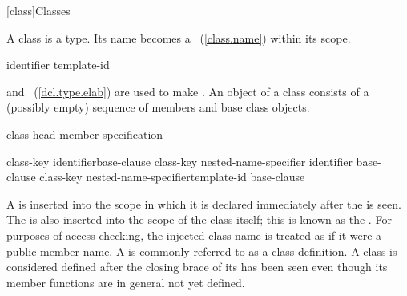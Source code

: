 [class]{Classes}%



\pnum
{}%
%
%
%
A class is a type.
%
Its name becomes a ~(\ref{class.name}) within its
scope.

\begin{bnf}
\br
    identifier\br
    template-id
\end{bnf}

 and
~(\ref{dcl.type.elab}) are used to
make . An object of a class consists of a
(possibly empty) sequence of members and base class objects.

\begin{bnf}
\br
    class-head \terminal{\{} member-specification\opt \terminal{\}}
\end{bnf}

\begin{bnf}
\br
    class-key identifier\opt base-clause\opt\br
    class-key nested-name-specifier identifier base-clause\opt\br
    class-key nested-name-specifier\opt template-id base-clause\opt
\end{bnf}

\begin{bnf}
\br
    \br
    \br
\end{bnf}

\pnum
A  is inserted into the scope in which it is
declared immediately after the  is seen. The
 is also inserted into the scope of the class
itself; this is known as the .
%
For purposes of access checking, the injected-class-name is treated as
if it were a public member name.
%
A  is commonly referred to as a class
definition.
%
A class is considered defined after the closing brace of its
 has been seen even though its member
functions are in general not yet defined.

